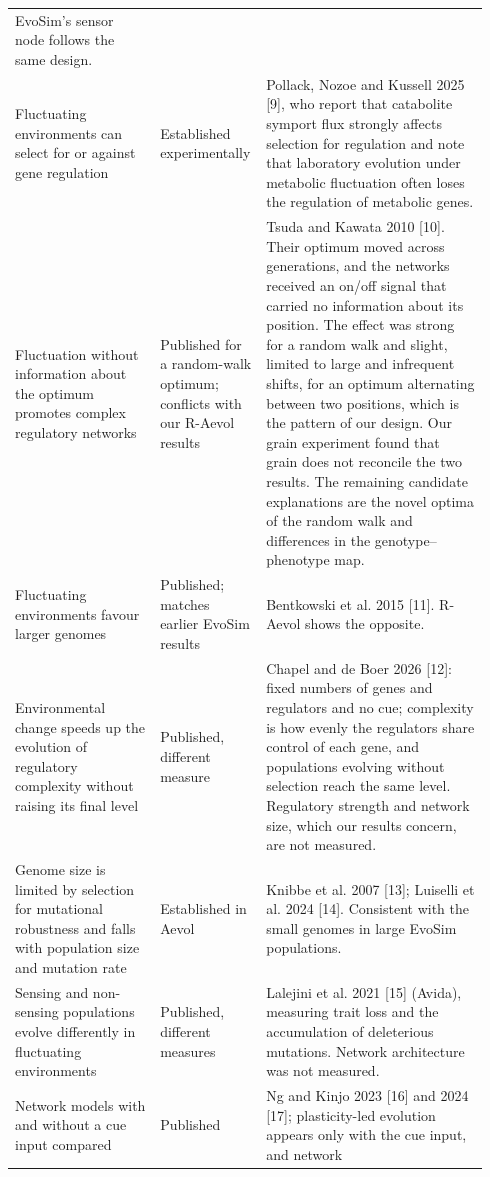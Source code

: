 \begin{longtable}{@{}p{0.3\linewidth}p{0.18\linewidth}p{0.46\linewidth}@{}}
EvoSim's sensor node follows the same design.\\
Fluctuating environments can select for or against gene regulation &
Established experimentally & Pollack, Nozoe and Kussell 2025 [9], who report that catabolite symport flux strongly affects selection for regulation and note that laboratory evolution under metabolic fluctuation often loses the regulation of metabolic genes.\\
Fluctuation without information about the optimum promotes complex regulatory
networks & Published for a random-walk optimum; conflicts with our R-Aevol results & Tsuda and Kawata 2010 [10]. Their optimum moved across generations, and
the networks received an on/off signal that carried no information about its
position. The effect was strong for a random walk and slight, limited to large
and infrequent shifts, for an optimum alternating between two positions, which
is the pattern of our design. Our grain experiment found that grain does not
reconcile the two results. The remaining candidate explanations are the novel
optima of the random walk and differences in the genotype--phenotype map.\\
Fluctuating environments favour larger genomes & Published; matches earlier EvoSim results & Bentkowski et al. 2015 [11]. R-Aevol shows the opposite.\\
Environmental change speeds up the evolution of regulatory complexity without
raising its final level & Published, different measure & Chapel and de Boer 2026
[12]: fixed numbers of genes and regulators and no cue; complexity is how evenly
the regulators share control of each gene, and populations evolving without
selection reach the same level. Regulatory strength and network size, which our
results concern, are not measured.\\
Genome size is limited by selection for mutational robustness and falls with
population size and mutation rate & Established in Aevol & Knibbe et al. 2007 [13];
Luiselli et al. 2024 [14]. Consistent with the small genomes in large EvoSim
populations.\\
Sensing and non-sensing populations evolve differently in fluctuating
environments & Published, different measures & Lalejini et al. 2021 [15]
(Avida), measuring trait loss and the accumulation of deleterious mutations. Network architecture was not measured.\\
Network models with and without a cue input compared & Published & Ng and Kinjo
2023 [16] and 2024 [17]; plasticity-led evolution appears only with the cue input, and network

\end{longtable}
